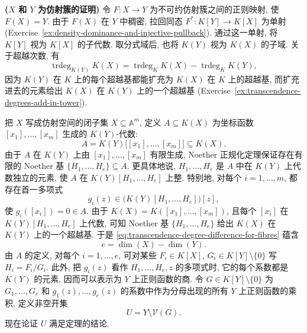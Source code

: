 \begin{Proof}
\textbf{($X$ 和 $Y$ 为仿射簇的证明)} 令 $F:X\to Y$ 为不可约仿射簇之间的正则映射, 使 $\overline{F(X)}=Y$. 由于 $F(X)$ 在 $Y$ 中稠密, 拉回同态 $F^{*}:K[Y]\to K[X]$ 为单射 (Exercise~\ref{ex:density-dominance-and-injective-pullback}). 通过这一单射, 将 $K[Y]$ 视为 $K[X]$ 的子代数. 取分式域后, 也将 $K(Y)$ 视为 $K(X)$ 的子域. 关于超越次数, 有
\begin{equation}\label{eq:transcendence-degree-difference-for-fibres}
  \operatorname{trdeg}_{K(Y)}K(X)
  =\operatorname{trdeg}_{K}K(X)-\operatorname{trdeg}_{K}K(Y),
\end{equation}
因为 $K(Y)$ 在 $K$ 上的每个超越基都能扩充为 $K(X)$ 在 $K$ 上的超越基, 而扩充进去的元素给出 $K(X)$ 在 $K(Y)$ 上的一个超越基 (Exercise~\ref{ex:transcendence-degrees-add-in-tower}).

把 $X$ 写成仿射空间的闭子集 $X\subseteq\mathbb{A}^{m}$, 定义 $A\subseteq K(X)$ 为坐标函数 $[x_{1}],\ldots,[x_{m}]$ 生成的 $K(Y)$-代数:
\[
  A=K(Y)\bigl[[x_{1}],\ldots,[x_{m}]\bigr]\subseteq K(X).
\]
由于 $A$ 在 $K(Y)$ 上由 $[x_{1}],\ldots,[x_{m}]$ 有限生成, Noether 正规化定理保证存在有限的 Noether 基 $\{H_{1},\ldots,H_{e}\}\subseteq A$. 更具体地说, $H_{1},\ldots,H_{e}$ 是 $A$ 中在 $K(Y)$ 上代数独立的元素, 使 $A$ 在 $K(Y)[H_{1},\ldots,H_{e}]$ 上整. 特别地, 对每个 $i=1,\ldots,m$, 都存在首一多项式
\[
  g_{i}(z)\in\bigl(K(Y)[H_{1},\ldots,H_{e}]\bigr)[z],
\]
使 $g_{i}([x_{i}])=0\in A$. 由于 $K(X)=K([x_{1}],\ldots,[x_{m}])$, 且每个 $[x_{i}]$ 在 $K(Y)[H_{1},\ldots,H_{e}]$ 上代数, 可知 Noether 基 $\{H_{1},\ldots,H_{e}\}$ 给出 $K(X)$ 在 $K(Y)$ 上的一个超越基. 于是 \eqref{eq:transcendence-degree-difference-for-fibres} 蕴含
\[
  e=\dim(X)-\dim(Y).
\]
由 $A$ 的定义, 对每个 $i=1,\ldots,e$, 可对某些 $F_{i}\in K[X]$, $G_{i}\in K[Y]\setminus\{0\}$ 写 $H_{i}=F_{i}/G_{i}$. 此外, 把 $g_{i}(z)$ 看作 $H_{1},\ldots,H_{e},z$ 的多项式时, 它的每个系数都是 $K(Y)$ 的元素, 因而可以表示为 $Y$ 上正则函数的商. 令 $G\in K[Y]\setminus\{0\}$ 为 $G_{1},\ldots,G_{e}$ 和 $g_{1}(z),\ldots,g_{e}(z)$ 的系数中作为分母出现的所有 $Y$ 上正则函数的乘积, 定义非空开集
\[
  U=Y\setminus\mathcal{V}(G).
\]
现在论证 $U$ 满足定理的结论.


\end{Proof}
